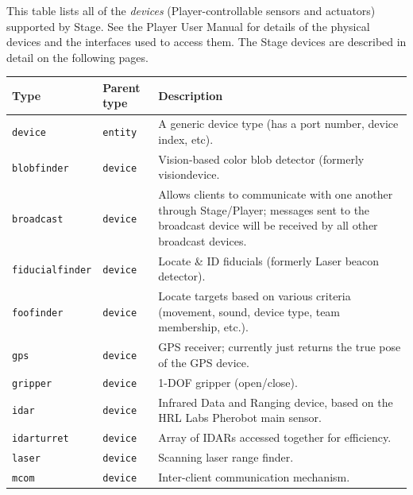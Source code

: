 \documentclass[11pt,twoside]{report}
\begin{document}
This table lists all of the {\em devices} (Player-controllable sensors
and actuators) supported by Stage.  See the Player User Manual for
details of the physical devices and the interfaces used to access
them. The Stage devices are described in detail on the following
pages.
\vspace{1em}\\\noindent
\begin{tabularx}{\columnwidth}{llX}
\hline 
Type & Parent type & Description \\
\hline

\verb'device' & \verb'entity' & A generic device type (has a port
number, device index, etc). \\

\hline

\verb'blobfinder' & \verb'device' & Vision-based color blob detector
(formerly visiondevice.\\

\verb'broadcast' & \verb'device' & Allows clients to communicate with
one another through Stage/Player; messages sent to the broadcast
device will be received by all other broadcast devices.\\

\verb'fiducialfinder' & \verb'device' & Locate \& ID fiducials (formerly Laser
beacon detector).\\

\verb'foofinder' & \verb'device' & Locate targets based on various criteria (movement, sound, device type, team membership, etc.).\\ 

\verb'gps' & \verb'device' & GPS receiver; currently just returns the
true pose of the GPS device.\\

\verb'gripper' & \verb'device' & 1-DOF gripper (open/close).\\

\verb'idar' & \verb'device' & Infrared Data and Ranging device, based
on the HRL Labs Pherobot main sensor.\\

\verb'idarturret' & \verb'device' & Array of IDARs accessed together
for efficiency.\\

\verb'laser' & \verb'device' & Scanning laser range finder.\\

\verb'mcom' & \verb'device' & Inter-client communication mechanism.\\


\end{tabularx}
\end{document}
